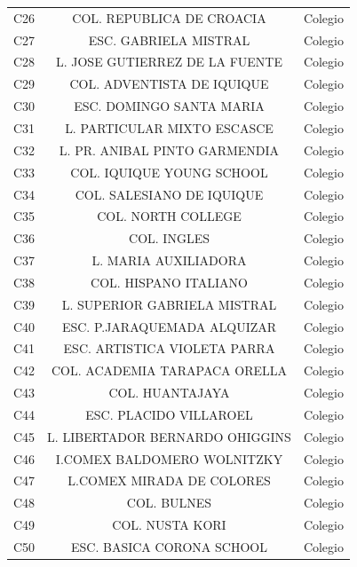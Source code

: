 \documentclass[12pt,a4paper]{article}
\begin{document}
\begin{table}[h!]
	\centering
	\begin{tabular}{|c|c|c|}
\hline
C26    & COL. REPUBLICA DE CROACIA        & Colegio     \\  
C27    & ESC. GABRIELA MISTRAL            & Colegio     \\  
C28    & L. JOSE GUTIERREZ DE LA FUENTE   & Colegio     \\  
C29    & COL. ADVENTISTA DE IQUIQUE       & Colegio     \\  
C30    & ESC. DOMINGO SANTA MARIA         & Colegio     \\ 
C31    & L. PARTICULAR MIXTO ESCASCE      & Colegio     \\  
C32    & L. PR. ANIBAL PINTO GARMENDIA    & Colegio     \\  
C33    & COL. IQUIQUE YOUNG SCHOOL        & Colegio     \\  
C34    & COL. SALESIANO DE IQUIQUE        & Colegio     \\  
C35    & COL. NORTH COLLEGE               & Colegio     \\  
C36    & COL. INGLES                      & Colegio     \\  
C37    & L. MARIA AUXILIADORA             & Colegio     \\  
C38    & COL. HISPANO ITALIANO            & Colegio     \\  
C39    & L. SUPERIOR GABRIELA MISTRAL     & Colegio     \\  
C40    & ESC. P.JARAQUEMADA ALQUIZAR      & Colegio     \\  
C41    & ESC. ARTISTICA VIOLETA PARRA     & Colegio     \\  
C42    & COL. ACADEMIA TARAPACA ORELLA    & Colegio     \\  
C43    & COL. HUANTAJAYA                  & Colegio     \\  
C44    & ESC. PLACIDO VILLAROEL           & Colegio     \\  
C45    & L. LIBERTADOR BERNARDO OHIGGINS  & Colegio     \\  
C46    & I.COMEX BALDOMERO WOLNITZKY      & Colegio     \\  
C47    & L.COMEX MIRADA DE COLORES        & Colegio     \\  
C48    & COL. BULNES                      & Colegio     \\  
C49    & COL. NUSTA KORI                  & Colegio     \\  
C50    & ESC. BASICA CORONA SCHOOL        & Colegio     \\  

\end{tabular}
\end{table}
\end{document}
